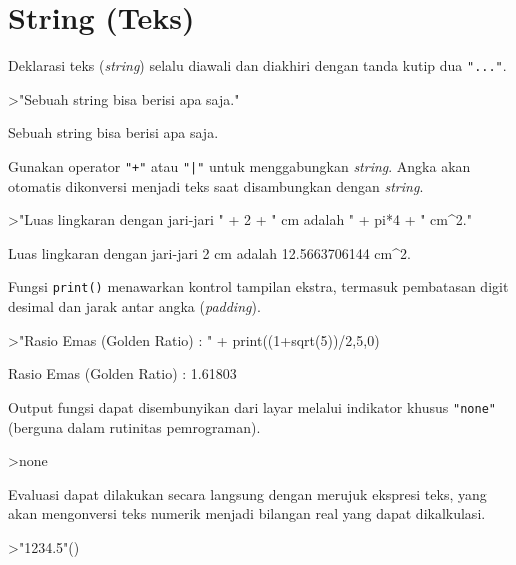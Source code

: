 \documentclass[a4paper,11pt,oneside,enabledeprecatedfontcommands]{scrbook}
\newenvironment{eulernotebook}{}{}
\newcommand{\eulersubheading}[1]{\section{#1}}
\newenvironment{eulercomment}{\par\medskip\noindent}{\par\medskip}
\begin{document}
\begin{eulernotebook}
\eulersubheading{String (Teks)}
\begin{eulercomment}
Deklarasi teks (\emph{string}) selalu diawali dan diakhiri dengan tanda kutip dua \texttt{"..."}.
\end{eulercomment}
\begin{eulerprompt}
>"Sebuah string bisa berisi apa saja."
\end{eulerprompt}
\begin{euleroutput}
Sebuah string bisa berisi apa saja.
\end{euleroutput}
\begin{eulercomment}
Gunakan operator \texttt{"+"} atau \texttt{"|"} untuk menggabungkan \emph{string}. Angka akan otomatis dikonversi menjadi teks saat disambungkan dengan \emph{string}.
\end{eulercomment}
\begin{eulerprompt}
>"Luas lingkaran dengan jari-jari " + 2 + " cm adalah " + pi*4 + " cm^2."
\end{eulerprompt}
\begin{euleroutput}
Luas lingkaran dengan jari-jari 2 cm adalah 12.5663706144 cm^2.
\end{euleroutput}
\begin{eulercomment}
Fungsi \texttt{print()} menawarkan kontrol tampilan ekstra, termasuk pembatasan digit desimal dan jarak antar angka (\emph{padding}).
\end{eulercomment}
\begin{eulerprompt}
>"Rasio Emas (Golden Ratio) : " + print((1+sqrt(5))/2,5,0)
\end{eulerprompt}
\begin{euleroutput}
Rasio Emas (Golden Ratio) : 1.61803
\end{euleroutput}
\begin{eulercomment}
Output fungsi dapat disembunyikan dari layar melalui indikator khusus \texttt{"none"} (berguna dalam rutinitas pemrograman).
\end{eulercomment}
\begin{eulerprompt}
>none
\end{eulerprompt}
\begin{eulercomment}
Evaluasi dapat dilakukan secara langsung dengan merujuk ekspresi teks, yang akan mengonversi teks numerik menjadi bilangan real yang dapat dikalkulasi.
\end{eulercomment}
\begin{eulerprompt}
>"1234.5"()
\end{eulerprompt}
\begin{euleroutput}

\end{euleroutput}
\end{eulernotebook}
\end{document}
